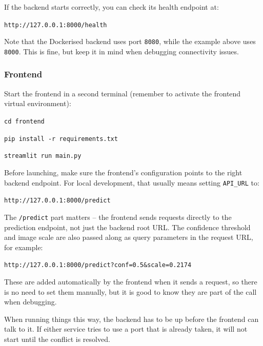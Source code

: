 \documentclass{article}
\begin{document}
If the backend starts correctly, you can check its health endpoint at:

\begin{center}
\texttt{http://127.0.0.1:8000/health}
\end{center}

Note that the Dockerised backend uses port \texttt{8080}, while the example above uses \texttt{8000}. This is fine, but keep it in mind when debugging connectivity issues.
\subsubsection{Frontend}

Start the frontend in a second terminal (remember to activate the frontend virtual environment):

\begin{center}
\texttt{cd frontend}
\end{center}

\begin{center}
\texttt{pip install -r requirements.txt}
\end{center}

\begin{center}
\texttt{streamlit run main.py}
\end{center}

Before launching, make sure the frontend's configuration points to the right backend endpoint. For local development, that usually means setting \texttt{API\_URL} to:

\begin{center}
\texttt{http://127.0.0.1:8000/predict}
\end{center}

The \texttt{/predict} part matters -- the frontend sends requests directly to the prediction endpoint, not just the backend root URL. The confidence threshold and image scale are also passed along as query parameters in the request URL, for example:

\begin{center}
\texttt{http://127.0.0.1:8000/predict?conf=0.5\&scale=0.2174}
\end{center}

These are added automatically by the frontend when it sends a request, so there is no need to set them manually, but it is good to know they are part of the call when debugging.

When running things this way, the backend has to be up before the frontend can talk to it. If either service tries to use a port that is already taken, it will not start until the conflict is resolved.
\end{document}
